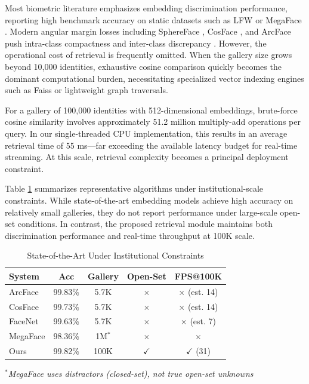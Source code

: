 \documentclass[conference]{IEEEtran}
\begin{document}
Most biometric literature emphasizes embedding discrimination performance, reporting high benchmark accuracy on static datasets such as LFW \cite{lfw} or MegaFace \cite{megaface}. Modern angular margin losses including SphereFace \cite{sphereface}, CosFace \cite{cosface}, and ArcFace \cite{b5} push intra-class compactness and inter-class discrepancy \cite{b11}. However, the operational cost of retrieval is frequently omitted. When the gallery size grows beyond 10,000 identities, exhaustive cosine comparison quickly becomes the dominant computational burden, necessitating specialized vector indexing engines such as Faiss \cite{b6} or lightweight graph traversals.

For a gallery of 100,000 identities with 512-dimensional embeddings, brute-force cosine similarity involves approximately 51.2 million multiply-add operations per query. In our single-threaded CPU implementation, this results in an average retrieval time of 55 ms---far exceeding the available latency budget for real-time streaming. At this scale, retrieval complexity becomes a principal deployment constraint.

Table \ref{tab:sota_constraints} summarizes representative algorithms under institutional-scale constraints. While state-of-the-art embedding models achieve high accuracy on relatively small galleries, they do not report performance under large-scale open-set conditions. In contrast, the proposed retrieval module maintains both discrimination performance and real-time throughput at 100K scale.

\begin{table}[htbp]
\caption{State-of-the-Art Under Institutional Constraints}
\begin{center}
\begin{tabular}{|l|c|c|c|c|}
\hline
System & Acc & Gallery & Open-Set & FPS@100K \\
\hline
ArcFace \cite{b5} & 99.83\% & 5.7K & $\times$ & $\times$ (est. 14) \\
\hline
CosFace \cite{cosface} & 99.73\% & 5.7K & $\times$ & $\times$ (est. 14) \\
\hline
FaceNet \cite{b18} & 99.63\% & 5.7K & $\times$ & $\times$ (est. 7) \\
\hline
MegaFace \cite{megaface} & 98.36\% & 1M$^*$ & $\times$ & $\times$ \\
\hline
Ours & 99.82\% & 100K & $\checkmark$ & $\checkmark$ (31) \\
\hline
\end{tabular}
\end{center}
\label{tab:sota_constraints}
\textit{$^*$MegaFace uses distractors (closed-set), not true open-set unknowns}
\end{table}
\end{document}
